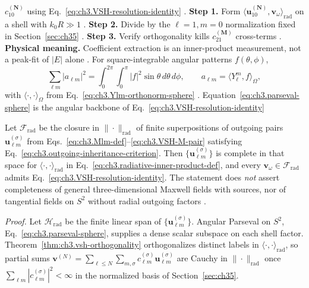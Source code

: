 \(c_{10}^{(\mathbf{N})}\) using Eq.~\eqref{eq:ch3.VSH-resolution-identity} .
\textbf{Step 1.} Form \(\langle \mathbf{u}_{10}^{(\mathbf{N})},\mathbf{v}_\omega\rangle_{\mathrm{rad}}\) on a shell
with \(k_{0}R\gg1\) .
\textbf{Step 2.} Divide by the \(\ell=1,m=0\) normalization fixed in Section~\ref{sec:ch35} .
\textbf{Step 3.} Verify orthogonality kills \(c_{21}^{(\mathbf{M})}\) cross-terms .
\textbf{Physical meaning.} Coefficient extraction is an inner-product measurement, not a peak-fit of
\(|E|\) alone .
For square-integrable angular patterns \(f(\theta,\phi)\),
\begin{equation}
\label{eq:ch3.parseval-sphere}
\sum_{\ell m}|a_{\ell m}|^{2}
=
\int_{0}^{2\pi}\!\int_{0}^{\pi}|f|^{2}\sin\theta\,d\theta\,d\phi,
\qquad
a_{\ell m}=\langle Y_{\ell}^{m},f\rangle_{\Omega},
\end{equation}
with \(\langle\cdot,\cdot\rangle_{\Omega}\) from Eq.~\eqref{eq:ch3.Ylm-orthonorm-sphere} .
Equation~\eqref{eq:ch3.parseval-sphere} is the angular backbone of Eq.~\eqref{eq:ch3.VSH-resolution-identity}
\begin{theorem}
\label{thm:ch3.vsh-completeness}
Let $\mathcal{F}_{\mathrm{rad}}$ be the closure in $\|\cdot\|_{\mathrm{rad}}$ of finite superpositions of outgoing pairs
$\mathbf{u}_{\ell m}^{(\sigma)}$ from Eqs.~\eqref{eq:ch3.Mlm-def}--\eqref{eq:ch3.VSH-M-pair} satisfying
Eq.~\eqref{eq:ch3.outgoing-inheritance-criterion}.
Then $\{\mathbf{u}_{\ell m}^{(\sigma)}\}$ is complete in that space for
$\langle\cdot,\cdot\rangle_{\mathrm{rad}}$ in Eq.~\eqref{eq:ch3.radiative-inner-product-def}, and every
$\mathbf{v}_\omega\in\mathcal{F}_{\mathrm{rad}}$ admits Eq.~\eqref{eq:ch3.VSH-resolution-identity}.
The statement does \emph{not} assert completeness of general three-dimensional Maxwell fields with sources, nor of tangential fields on $S^2$ without radial outgoing factors \cite{hansen1988,stratton1941}.
\end{theorem}
\noindent\textit{Proof.}
Let $\mathcal{H}_{\mathrm{rad}}$ be the finite linear span of $\{\mathbf{u}_{\ell m}^{(\sigma)}\}$.
Angular Parseval on $S^{2}$, Eq.~\eqref{eq:ch3.parseval-sphere}, supplies a dense scalar subspace on each shell factor.
Theorem~\ref{thm:ch3.vsh-orthogonality} orthogonalizes distinct labels in
$\langle\cdot,\cdot\rangle_{\mathrm{rad}}$, so partial sums $\mathbf{v}^{(N)}=\sum_{\ell\le N}\sum_{m,\sigma}c_{\ell m}^{(\sigma)}\mathbf{u}_{\ell m}^{(\sigma)}$
are Cauchy in $\|\cdot\|_{\mathrm{rad}}$ once $\sum_{\ell m}|c_{\ell m}^{(\sigma)}|^{2}<\infty$ in the normalized basis of Section~\ref{sec:ch35}.
